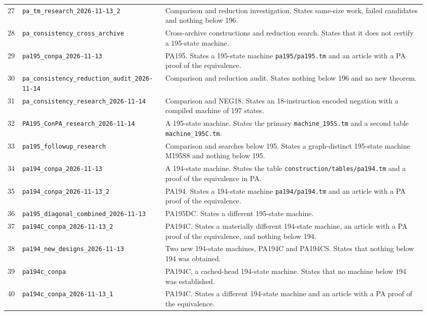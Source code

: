 \begin{longtable}{@{}p{0.035\linewidth}p{0.325\linewidth}p{0.60\linewidth}@{}}
27 & \nolinkurl{pa_tm_research_2026-11-13_2} & Comparison and reduction investigation. States same-size work, failed candidates and nothing below 196.\\[5pt]
28 & \nolinkurl{pa_consistency_cross_archive} & Cross-archive constructions and reduction search. States that it does not certify a 195-state machine.\\[5pt]
29 & \nolinkurl{pa195_conpa_2026-11-13} & PA195. States a 195-state machine \nolinkurl{pa195/pa195.tm} and an article with a PA proof of the equivalence.\\[5pt]
30 & \nolinkurl{pa_consistency_reduction_audit_2026-11-14} & Comparison and reduction audit. States nothing below 196 and no new theorem.\\[5pt]
31 & \nolinkurl{pa_consistency_research_2026-11-14} & Comparison and NEG18. States an 18-instruction encoded negation with a compiled machine of 197 states.\\[5pt]
32 & \nolinkurl{PA195_ConPA_research_2026-11-14} & A 195-state machine. States the primary \nolinkurl{machine_195S.tm} and a second table \nolinkurl{machine_195C.tm}.\\[5pt]
33 & \nolinkurl{pa195_followup_research} & Comparison and searches below 195. States a graph-distinct 195-state machine M195S8 and nothing below 195.\\[5pt]
34 & \nolinkurl{pa194_conpa_2026-11-13} & A 194-state machine. States the table \nolinkurl{construction/tables/pa194.tm} and a proof of the equivalence in PA.\\[5pt]
35 & \nolinkurl{pa194_conpa_2026-11-13_2} & PA194. States a 194-state machine \nolinkurl{pa194/pa194.tm} and an article with a PA proof of the equivalence.\\[5pt]
36 & \nolinkurl{pa195_diagonal_combined_2026-11-13} & PA195DC. States a different 195-state machine.\\[5pt]
37 & \nolinkurl{pa194C_conpa_2026-11-13_2} & PA194C. States a materially different 194-state machine, an article with a PA proof of the equivalence, and nothing below 194.\\[5pt]
38 & \nolinkurl{pa194_new_designs_2026-11-13} & Two new 194-state machines, PA194C and PA194CS. States that nothing below 194 was obtained.\\[5pt]
39 & \nolinkurl{pa194c_conpa} & PA194C, a cached-head 194-state machine. States that no machine below 194 was established.\\[5pt]
40 & \nolinkurl{pa194c_conpa_2026-11-13_1} & PA194C. States a different 194-state machine and an article with a PA proof of the equivalence.\\[5pt]

\end{longtable}
